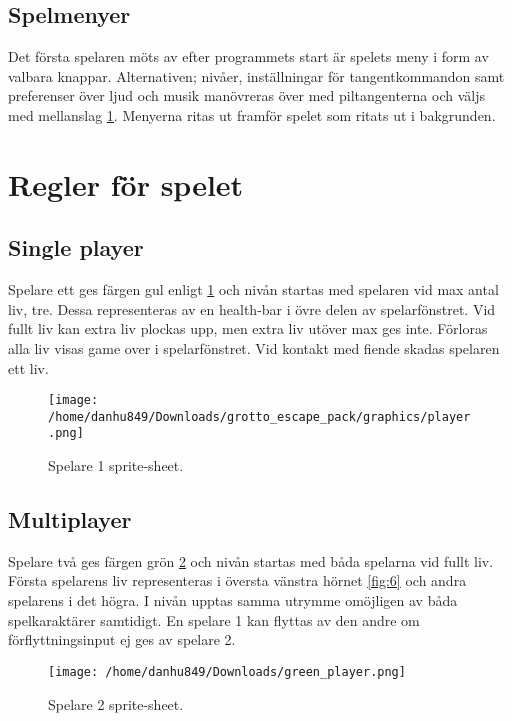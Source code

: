 \documentclass{TDP005mall}
\begin{document}
\subsection{Spelmenyer}
Det första spelaren möts av efter programmets start är spelets meny i form av valbara knappar. Alternativen; nivåer, inställningar för tangentkommandon samt preferenser över ljud och musik manövreras över med piltangenterna och väljs med mellanslag \ref{fig:4}. Menyerna ritas ut framför spelet som ritats ut i bakgrunden.

\newpage

\section{Regler för spelet}%

\subsection{Single player}
 Spelare ett ges färgen gul enligt \ref{fig:4} och nivån startas med spelaren vid max antal liv, tre. Dessa representeras av en health-bar i övre delen av spelarfönstret. Vid fullt liv kan extra liv plockas upp, men extra liv utöver max ges inte. Förloras alla liv visas game over i spelarfönstret. Vid kontakt med fiende skadas spelaren ett liv.

\begin{figure}[h!]
  \texttt{[image: /home/danhu849/Downloads/grotto\_escape\_pack/graphics/player.png]}
  \caption{Spelare 1 sprite-sheet.\label{fig:4}}
\end{figure}

\subsection{Multiplayer}
Spelare två ges färgen grön \ref{fig:5} och nivån startas med båda spelarna vid fullt liv. Första spelarens liv representeras i översta vänstra hörnet \ref{fig:6} och andra spelarens i det högra. I nivån upptas samma utrymme omöjligen av båda spelkaraktärer samtidigt. En spelare 1 kan flyttas av den andre om förflyttningsinput ej ges av spelare 2.

\begin{figure}[h!]
  \texttt{[image: /home/danhu849/Downloads/green\_player.png]}
  \caption{Spelare 2 sprite-sheet.\label{fig:5}}
\end{figure}
\end{document}
